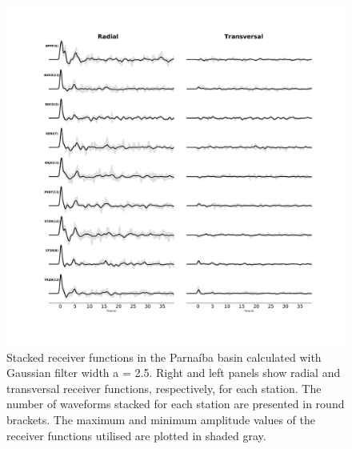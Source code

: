 \documentclass[paper,11pt]{geophysics}
\begin{document}
\begin{figure}[!ht]
\begin{center}
\includegraphics[width=\textwidth]{Fig/stations_FR.pdf}
\caption{Stacked receiver functions in the Parnaíba basin calculated with Gaussian filter width a = 2.5. Right and left panels show radial and transversal receiver functions, respectively, for each station. The number of waveforms stacked for each station are presented in round brackets. The maximum and minimum amplitude values of the receiver functions utilised are plotted in shaded gray.}
\label{estations_FR}
\end{center}
\end{figure}

\pagebreak
\end{document}
